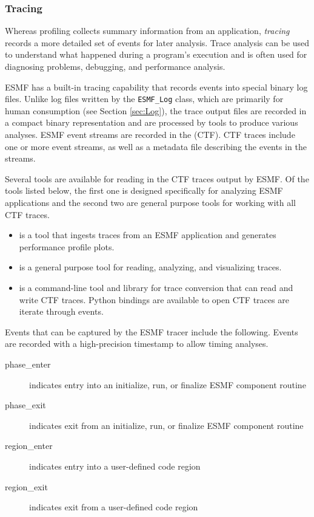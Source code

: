 \subsubsection{Tracing}
\label{sec:Tracing}

Whereas profiling collects summary information from an application,
{\em tracing} records a more detailed set of events for later analysis. Trace
analysis can be used to understand what happened during a program's
execution and is often used for diagnosing problems, debugging, and
performance analysis.

ESMF has a built-in tracing capability that records events into special
binary log files.  Unlike log files written by the {\tt ESMF\_Log} class,
which are primarily for human consumption (see Section \ref{sec:Log}),
the trace output files are
recorded in a compact binary representation and are processed by tools
to produce various analyses. ESMF event streams are recorded in the
 (CTF).
CTF traces include one or more event streams,
as well as a metadata file describing the events in the streams.

Several tools are available for reading in the CTF traces output by ESMF.
Of the tools listed below, the first one is designed specifically for
analyzing ESMF applications and the second two are general purpose tools
for working with all CTF traces.
\begin{itemize}
\item {}
  is a tool that ingests traces from an ESMF application and generates
  performance profile plots.
\item {}
  is a general purpose tool for reading, analyzing, and visualizing traces.
\item {}
  is a command-line tool and library for trace conversion
  that can read and write CTF traces. Python bindings are available
  to open CTF traces are iterate through events.  
\end{itemize}

Events that can be captured by the ESMF tracer include the following. Events
are recorded with a high-precision timestamp to allow timing analyses.
\begin{description}
\item [phase\_enter] indicates entry into an initialize, run, or finalize ESMF component routine
\item [phase\_exit] indicates exit from an initialize, run, or finalize ESMF component routine
\item [region\_enter] indicates entry into a user-defined code region
\item [region\_exit] indicates exit from a user-defined code region
\end{description}

